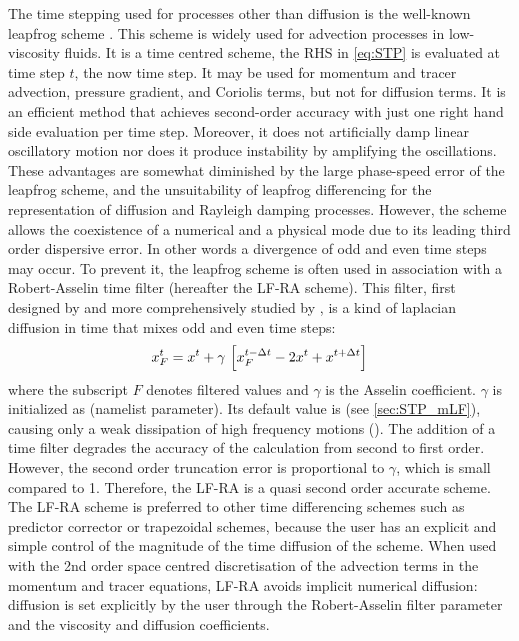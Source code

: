 \documentclass[../main/NEMO_manual]{subfiles}
\begin{document}
The time stepping used for processes other than diffusion is the well-known leapfrog scheme
\citep{Mesinger_Arakawa_Bk76}.
This scheme is widely used for advection processes in low-viscosity fluids.
It is a time centred scheme, \ie the RHS in \autoref{eq:STP} is evaluated at time step $t$, the now time step.
It may be used for momentum and tracer advection, pressure gradient, and Coriolis terms,
but not for diffusion terms.
It is an efficient method that achieves second-order accuracy with
just one right hand side evaluation per time step.
Moreover, it does not artificially damp linear oscillatory motion nor does it produce instability by
amplifying the oscillations.
These advantages are somewhat diminished by the large phase-speed error of the leapfrog scheme,
and the unsuitability of leapfrog differencing for the representation of diffusion and Rayleigh damping processes.
However, the scheme allows the coexistence of a numerical and a physical mode due to
its leading third order dispersive error.
In other words a divergence of odd and even time steps may occur.
To prevent it, the leapfrog scheme is often used in association with a Robert-Asselin time filter
(hereafter the LF-RA scheme).
This filter, first designed by \citet{Robert_JMSJ66} and more comprehensively studied by \citet{Asselin_MWR72},
is a kind of laplacian diffusion in time that mixes odd and even time steps:
\begin{equation}
  \label{eq:STP_asselin}
  x_F^t  = x^t + \gamma \, \left[ x_F^{t-\Delta t} - 2 x^t + x^{t+\Delta t} \right]
\end{equation} 
where the subscript $F$ denotes filtered values and $\gamma$ is the Asselin coefficient.
$\gamma$ is initialized as  (namelist parameter).
Its default value is  (see \autoref{sec:STP_mLF}),
causing only a weak dissipation of high frequency motions (\citep{Farge1987}).
The addition of a time filter degrades the accuracy of the calculation from second to first order.
However, the second order truncation error is proportional to $\gamma$, which is small compared to 1.
Therefore, the LF-RA is a quasi second order accurate scheme.
The LF-RA scheme is preferred to other time differencing schemes such as predictor corrector or trapezoidal schemes,
because the user has an explicit and simple control of the magnitude of the time diffusion of the scheme.
When used with the 2nd order space centred discretisation of the advection terms in
the momentum and tracer equations, LF-RA avoids implicit numerical diffusion:
diffusion is set explicitly by the user through the Robert-Asselin 
filter parameter and the viscosity and diffusion coefficients.
\end{document}
